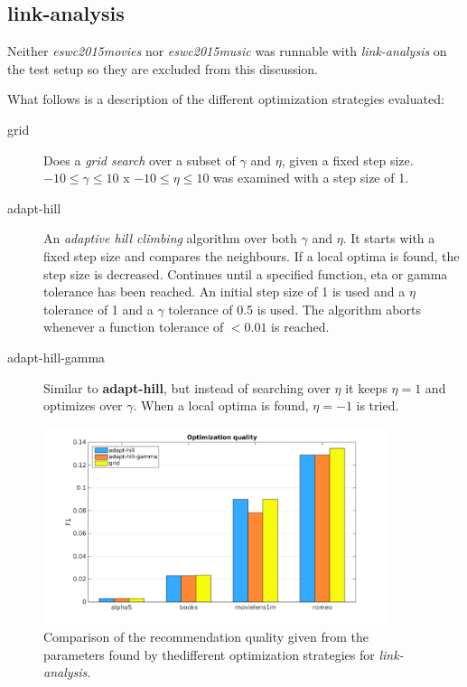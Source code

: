 
\subsection{link-analysis}\label{sec:tuning:link}

Neither \textit{eswc2015movies} nor \textit{eswc2015music} was runnable with \textit{link-analysis} on the test setup so they are excluded from this discussion.

What follows is a description of the different optimization strategies evaluated:

\begin{description}
    \item[grid]
        Does a \textit{grid search} over a subset of $\gamma$ and $\eta$, given a fixed step size. $-10 \leq \gamma \leq 10$ x $-10 \leq \eta \leq 10$ was examined with a step size of 1.
    \item[adapt-hill]
        An \textit{adaptive hill climbing} algorithm over both $\gamma$ and $\eta$. It starts with a fixed step size and compares the neighbours. If a local optima is found, the step size is decreased. Continues until a specified function, eta or gamma tolerance has been reached. An initial step size of 1 is used and a $\eta$ tolerance of 1 and a $\gamma$ tolerance of 0.5 is used. The algorithm aborts whenever a function tolerance of $< 0.01$ is reached.
    \item[adapt-hill-gamma]
        Similar to \textbf{adapt-hill}, but instead of searching over $\eta$ it keeps $\eta = 1$ and optimizes over $\gamma$. When a local optima is found, $\eta = -1$ is tried.
\end{description}


\begin{figure}[h!]
    \centering
    \includegraphics[width=0.9\textwidth]{fig/comp/comp_link_quality.png}
    \caption{Comparison of the recommendation quality given from the parameters found by thedifferent optimization strategies for \textit{link-analysis}.}
\end{figure}

